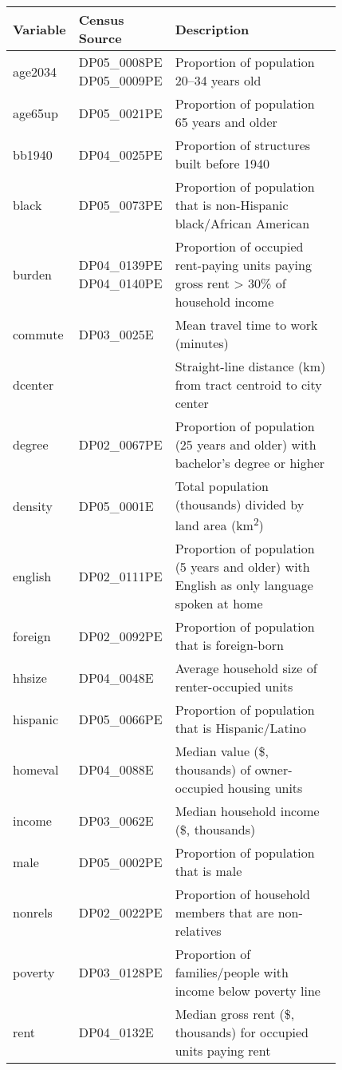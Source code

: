 \begin{tabular}{l p{0.15\linewidth} p{0.675\linewidth}}
\toprule
Variable & Census Source & Description \\
\midrule
age2034  & DP05\_0008PE DP05\_0009PE & Proportion of population 20--34 years old\\
age65up  & DP05\_0021PE & Proportion of population 65 years and older\\
bb1940   & DP04\_0025PE & Proportion of structures built before 1940\\
black    & DP05\_0073PE & Proportion of population that is non-Hispanic black/African American\\
burden   & DP04\_0139PE DP04\_0140PE & Proportion of occupied rent-paying units paying gross rent > 30\% of household income\\
commute  & DP03\_0025E  & Mean travel time to work (minutes)\\
dcenter  &              & Straight-line distance (km) from tract centroid to city center\\
degree   & DP02\_0067PE & Proportion of population (25 years and older) with bachelor's degree or higher\\
density  & DP05\_0001E  & Total population (thousands) divided by land area (km\textsuperscript{2})\\
english  & DP02\_0111PE & Proportion of population (5 years and older) with English as only language spoken at home\\
foreign  & DP02\_0092PE & Proportion of population that is foreign-born\\
hhsize   & DP04\_0048E  & Average household size of renter-occupied units\\
hispanic & DP05\_0066PE & Proportion of population that is Hispanic/Latino\\
homeval  & DP04\_0088E  & Median value (\$, thousands) of owner-occupied housing units\\
income   & DP03\_0062E  & Median household income (\$, thousands)\\
male     & DP05\_0002PE & Proportion of population that is male\\
nonrels  & DP02\_0022PE & Proportion of household members that are non-relatives\\
poverty  & DP03\_0128PE & Proportion of families/people with income below poverty line\\
rent     & DP04\_0132E  & Median gross rent (\$, thousands) for occupied units paying rent\\

\end{tabular}

